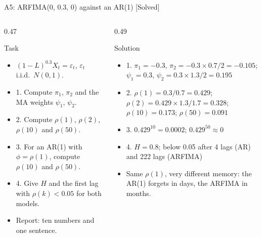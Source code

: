 \begin{frame}{A5: ARFIMA(0, 0.3, 0) against an AR(1) [Solved]}
\itemsize{\scriptsize}
\begin{columns}[T]
\begin{column}{0.47\textwidth}
\begin{block}{Task}
\begin{itemize}
    \item $(1 - L)^{0.3}X_t = \varepsilon_t$, $\varepsilon_t$ i.i.d.\ $N(0, 1)$.
    \item 1. Compute $\pi_1$, $\pi_2$ and the MA weights $\psi_1$, $\psi_2$.
    \item 2. Compute $\rho(1)$, $\rho(2)$, $\rho(10)$ and $\rho(50)$.
    \item 3. For an AR(1) with $\phi = \rho(1)$, compute $\rho(10)$ and $\rho(50)$.
    \item 4. Give $H$ and the first lag with $\rho(k) < 0.05$ for both models.
    \item Report: ten numbers and one sentence.
\end{itemize}
\end{block}
\end{column}
\begin{column}{0.49\textwidth}
\begin{exampleblock}{Solution}
\begin{itemize}
    \item 1. $\pi_1 = -0.3$, $\pi_2 = -0.3 \times 0.7/2 = -0.105$; $\psi_1 = 0.3$, $\psi_2 = 0.3 \times 1.3/2 = 0.195$
    \item 2. $\rho(1) = 0.3/0.7 = 0.429$; $\rho(2) = 0.429 \times 1.3/1.7 = 0.328$; $\rho(10) = 0.173$; $\rho(50) = 0.091$
    \item 3. $0.429^{10} = 0.0002$; $0.429^{50} \approx 0$
    \item 4. $H = 0.8$; below 0.05 after 4 lags (AR) and 222 lags (ARFIMA)
    \item Same $\rho(1)$, very different memory: the AR(1) forgets in days, the ARFIMA in months.
\end{itemize}
\end{exampleblock}
\end{column}
\end{columns}
\end{frame}

